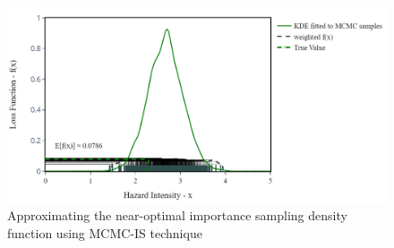     \begin{figure}[H]
        \centering
        \includegraphics[scale=0.5]{Figures/Images/Illustrative Example/MCMC_IS_samples.png}
        \caption{Approximating the near-optimal importance sampling density function using MCMC-IS technique}
        \label{fig:MCMC_IS_samples}
    \end{figure}